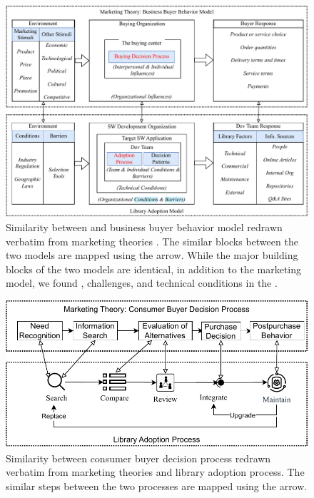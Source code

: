 \begin{figure}
    \centering
    \includegraphics[scale=0.8]{images/Buyer-behavior-models-comparison.pdf}
    \caption{Similarity between \model\space and business buyer behavior model redrawn verbatim from marketing theories \cite{kotler2014principles}. The similar blocks between the two models are mapped using the arrow. While the major building blocks of the two models are identical, in addition to the marketing model, we found \principle\space, challenges, and technical conditions in the \model.}
    \label{fig:model-comparison}
\end{figure}

\begin{figure}
    \centering
    \includegraphics[scale=.8]{images/Decision-adoption-process-comparison.pdf}
    \caption{Similarity between consumer buyer decision process redrawn verbatim from marketing theories \cite{kotler2014principles} and library adoption process. The similar steps between the two processes are mapped using the arrow.}
    \label{fig:process-comparison}
\end{figure}

